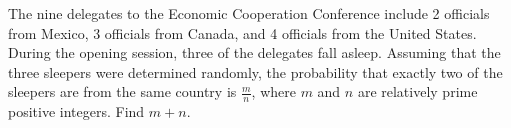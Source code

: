 The nine delegates to the Economic Cooperation Conference include 2 officials from Mexico, 3 officials from Canada, and 4 officials from the United States. During the opening session, three of the delegates fall asleep. Assuming that the three sleepers were determined randomly, the probability that exactly two of the sleepers are from the same country is $\tfrac{m}{n}$, where $m$ and $n$ are relatively prime positive integers. Find $m+n$.